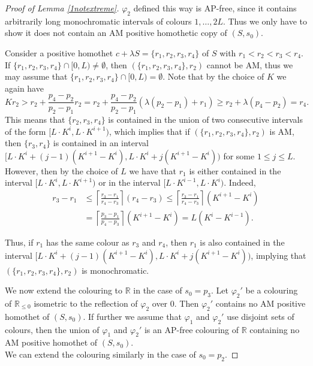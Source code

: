 \documentclass[12pt]{article}
\theoremstyle{plain}
\theoremstyle{definition}
\begin{document}
\begin{proof}[Proof of Lemma \ref{1notextreme}]
$\varphi_2$ defined this way is AP-free, since it contains arbitrarily long monochromatic intervals of colours $1,\dots,2L$. Thus we only have to show it does not contain an AM positive homothetic copy of $(S,s_0)$. 

Consider a positive homothet $c+\lambda S=\{r_1,r_2,r_3,r_4\}$ of $S$ with $r_1<r_2<r_3<r_4$. If $\{r_1,r_2,r_3,r_4\}\cap [0,L)\neq \emptyset$, then $(\{r_1,r_2,r_3,r_4\},r_2)$ cannot be AM, thus we may assume that $\{r_1,r_2,r_3,r_4\}\cap [0,L)=\emptyset$. Note that by the choice of $K$ we again have 
\[Kr_2>
r_2+\frac{p_4-p_2}{p_2-p_1} r_2=
r_2+\frac{p_4-p_2}{p_2-p_1} (\lambda(p_2-p_1)+r_1)\ge
r_2+\lambda (p_4-p_2)=
r_4.\]
This means that $\{r_2,r_3,r_4\}$ is contained in the union of two consecutive intervals of the form $[L\cdot K^i,L\cdot K^{i+1})$, which implies that if $\left (\{r_1,r_2,r_3,r_4\},r_2\right )$ is AM, then $\{r_3,r_4\}$ is contained in an interval $[L\cdot K^i+(j-1)(K^{i+1}-K^i),L\cdot K^{i}+j(K^{i+1}-K^i))$ for some $1\leq j \leq L$. However, then by the choice of $L$ we have that $r_1$ is either contained in the interval $[L\cdot K^i,L\cdot K^{i+1})$ or in the interval $[L\cdot K^{i-1},L\cdot K^i)$. Indeed, 
\begin{align*}
    r_3-r_1&\leq \left \lceil \frac{r_3-r_1}{r_4-r_3}\right \rceil (r_4-r_3) \leq \left \lceil \frac{r_3-r_1}{r_4-r_3}\right \rceil (K^{i+1}-K^i)\\
    &=  \left \lceil \frac{p_3-p_1}{p_4-p_3}\right \rceil (K^{i+1}-K^i)
=L(K^i-K^{i-1}).
\end{align*}

Thus, if $r_1$ has the same colour as $r_3$ and $r_4$, then $r_1$ is also contained in the \mbox{interval} \mbox{$[L\cdot K^i+(j-1)(K^{i+1}-K^i),L\cdot K^{i}+j(K^{i+1}-K^i))$}, implying that $\left(\{r_1,r_2,r_3,r_4\},r_2\right)$ is mo\-no\-chro\-ma\-tic.

\medskip
We now extend the colouring to $\mathbb{R}$ in the case of $s_0=p_3$. Let $\varphi_2'$ be a colouring of $\mathbb{R}_{\leq 0}$ isometric to the reflection of $\varphi_2$ over $0$. Then $\varphi_2'$ contains no AM positive homothet of $(S,s_0)$.
If further we assume that $\varphi_1$ and $\varphi_2'$ use disjoint sets of colours, then the union of $\varphi_1$ and $\varphi_2'$ is an AP-free colouring of $\mathbb{R}$ containing no AM positive homothet of $(S,s_0)$.\\
We can extend the colouring similarly in the case of $s_0=p_2$.
\end{proof}
\end{document}
